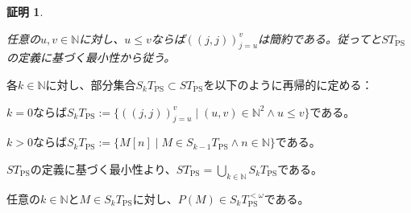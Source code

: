 \documentclass[dvipdfmx,uplatex]{jsarticle}
\theoremstyle{customnonumberbreakfortheorem}
\theoremstyle{customnonumberbreakforproof}
\newtheorem{hideableproof}{証明}
\begin{document}
\begin{hideableproof}
	\begin{indented}
		\item 任意の\(u,v \in \mathbb{N}\)に対し、\(u \leq v\)ならば\(((j,j))_{j=u}^{v}\)は簡約である。従ってと\(ST_{\textrm{PS}}\)の定義に基づく最小性から従う。
	\end{indented}
\end{hideableproof}

各\(k \in \mathbb{N}\)に対し、部分集合\(S_kT_{\textrm{PS}} \subset ST_{\textrm{PS}}\)を以下のように再帰的に定める：
\begin{nenumerate}
	\item \(k = 0\)ならば\(S_kT_{\textrm{PS}} := \{((j,j))_{j=u}^{v} \mid (u,v) \in \mathbb{N}^2 \land u \leq v\}\)である。
	\item \(k > 0\)ならば\(S_kT_{\textrm{PS}} := \{M[n] \mid M \in S_{k-1}T_{\textrm{PS}} \wedge n \in \mathbb{N}\}\)である。
\end{nenumerate}

\(ST_{\textrm{PS}}\)の定義に基づく最小性より、\(ST_{\textrm{PS}} = \bigcup_{k \in \mathbb{N}} S_kT_{\textrm{PS}}\)である。

\begin{proposition}[標準形の単項成分が標準形であること]\label{標準形の単項成分が標準形であること}
	任意の\(k \in \mathbb{N}\)と\(M \in S_kT_{\textrm{PS}}\)に対し、\(P(M) \in S_kT_{\textrm{PS}}^{< \omega}\)である。
\end{proposition}
\end{document}

